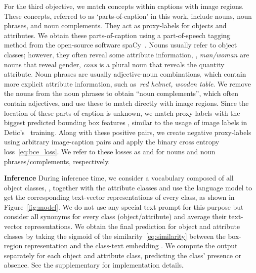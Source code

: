 \documentclass[10pt,twocolumn,letterpaper]{article}
\renewcommand\paragraph[1]{\vspace{0.12cm}\noindent\textbf{#1}}
\begin{document}
For the third objective, we match concepts within captions with image regions.
These concepts, referred to as `parts-of-caption' in this work, include nouns, noun phrases, and noun complements. They act as proxy-labels for objects and attributes. 
We obtain these parts-of-caption using a part-of-speech tagging method from the open-source software spaCy~\cite{spacy}.
Nouns usually refer to object classes; however, they often reveal some attribute information, 
\eg, \textit{man/woman} are nouns that reveal gender, \textit{cows} is a plural noun that reveals the quantity attribute. Noun phrases are usually adjective-noun combinations, which contain more explicit attribute information, such as~\textit{red helmet, wooden table}. 
We remove the nouns from the noun phrases to obtain ``noun complements'', which often contain adjectives, and use these to match directly with image regions. 
Since the location of these parts-of-caption is unknown, we match proxy-labels with the biggest predicted bounding box features , similar to the usage of image labels in Detic's~\cite{detic} training. 
Along with these positive pairs, we create negative proxy-labels using arbitrary image-caption pairs and apply the binary cross entropy loss~\eqref{eq:bce_loss}. We refer to these losses as  and  for nouns and noun phrases/complements, respectively. 

\paragraph{Inference} During inference time, we consider a vocabulary composed of all object classes, , together with the attribute classes  and use the language model  to get the corresponding text-vector representations of every class, as shown in Figure~\ref{fig:model}. 
We do not use any special text prompt for this purpose but consider all synonyms for every class (object/attribute) and average their text-vector representations. 
We obtain the final prediction for object and attribute classes by taking the sigmoid of the similarity~\eqref{eq:similarity} between the box-region representation  and the class-text embedding . We compute the output separately for each object and attribute class, predicting the class' presence or absence. 
See the supplementary for implementation details.






 
\end{document}
